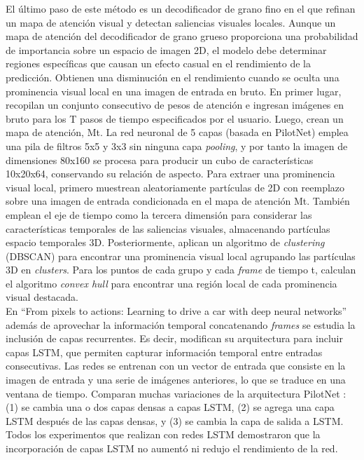 El último paso de este método es un decodificador de grano fino en el que refinan un mapa de atención visual y detectan saliencias visuales locales. Aunque un mapa de atención del decodificador de grano grueso proporciona una probabilidad de importancia sobre un espacio de imagen 2D, el modelo debe determinar regiones específicas que causan un efecto casual en el rendimiento de la predicción. Obtienen una disminución en el rendimiento cuando se oculta una prominencia visual local en una imagen de entrada en bruto. En primer lugar, recopilan un conjunto consecutivo de pesos de atención e ingresan imágenes en bruto para los T pasos de  tiempo especificados por el usuario. Luego, crean un mapa de atención, Mt. La red neuronal de 5 capas (basada en PilotNet) emplea una pila de filtros 5x5 y 3x3 sin ninguna capa \textit{pooling}, y por tanto la imagen de dimensiones 80x160 se procesa para producir un cubo de características 10x20x64, conservando su relación de aspecto. Para extraer una prominencia visual local, primero muestrean aleatoriamente partículas de 2D con reemplazo sobre una imagen de entrada condicionada en el mapa de atención Mt. También emplean el eje de tiempo como la tercera dimensión para considerar las características temporales de las saliencias visuales, almacenando partículas espacio temporales 3D. Posteriormente, aplican un algoritmo de \textit{clustering} (DBSCAN) para encontrar una prominencia visual local agrupando las partículas 3D en \textit{clusters}. Para los puntos de cada grupo y cada \textit{frame} de tiempo t, calculan el algoritmo \textit{convex hull} para encontrar una región local de cada prominencia visual destacada.\\

En ``From pixels to actions: Learning to drive a car with deep neural networks'' \cite{pixels} además de aprovechar la información temporal concatenando \textit{frames} se estudia la inclusión de capas recurrentes. Es decir, modifican su arquitectura para incluir capas LSTM, que permiten capturar información temporal entre entradas consecutivas. Las redes se entrenan con un vector de entrada que consiste en la imagen de entrada y una serie de imágenes anteriores, lo que se traduce en una ventana de tiempo. Comparan muchas variaciones de la arquitectura PilotNet \cite{end2end}: (1) se cambia una o dos capas densas a capas LSTM, (2) se agrega una capa LSTM después de las capas densas, y (3) se cambia la capa de salida a LSTM. Todos los experimentos que realizan con redes LSTM demostraron que la incorporación de capas LSTM no aumentó ni redujo el rendimiento de la red.\\

